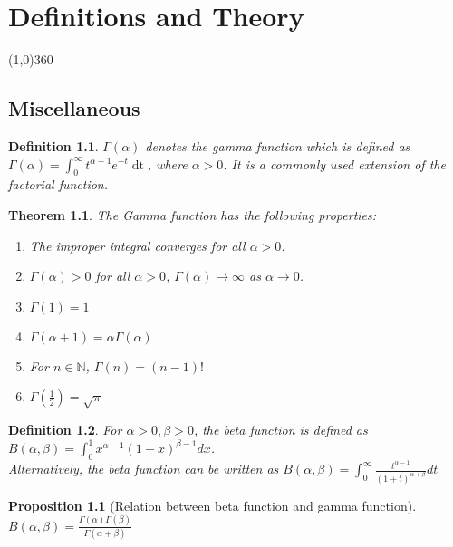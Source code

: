 \documentclass[12pt,twoside]{report}
\theoremstyle{thmstyle}
\newtheorem{defn}{Definition}
\newtheorem{thm}{Theorem}
\newtheorem{prop}[subsection]{Proposition}
\begin{document}
\tableofcontents
\newpage
{}

\chapter{Definitions and Theory}
\line(1,0){360} \\

\section{Miscellaneous}

\begin{defn}
    $\Gamma(\alpha)$ denotes the gamma function which is defined as $\Gamma(\alpha) = \displaystyle\int_0^\infty t ^{\alpha - 1} e ^{-t} \mathop{\mathrm{d} t}$, where $\alpha > 0$. It is a commonly used extension of the factorial function.
\end{defn}

\begin{thm}
    The Gamma function has the following properties:
    \begin{enumerate}
        \item The improper integral converges for all $\alpha > 0$.
        \item $\Gamma(\alpha) > 0$  for all $\alpha > 0$, $\Gamma(\alpha) \to \infty$ as $\alpha \to 0$.
        \item $\Gamma(1) = 1$
        \item $\Gamma(\alpha + 1) = \alpha \Gamma(\alpha)$
        \item For $n \in \mathbb{N}$, $\Gamma(n) = (n-1)!$
        \item $\Gamma(\frac{1}{2}) = \sqrt{\pi}$
    \end{enumerate}
\end{thm}

\begin{defn}
    For $\alpha > 0, \beta > 0$, the beta function is defined as $B(\alpha, \beta) = \displaystyle\int_0^1 x^{\alpha -1} (1-x)^{\beta - 1} dx$.
    \\

    Alternatively, the beta function can be written as $B(\alpha, \beta) = \displaystyle\int_0^\infty \frac{t^{\alpha - 1}}{(1+t)^{\alpha + \beta}} dt$
\end{defn}

\begin{prop}[Relation between beta function and gamma function]\ \\
    $B(\alpha, \beta) = \displaystyle\frac{\Gamma(\alpha)\Gamma(\beta)}{\Gamma(\alpha + \beta)}$
\end{prop}
\end{document}
